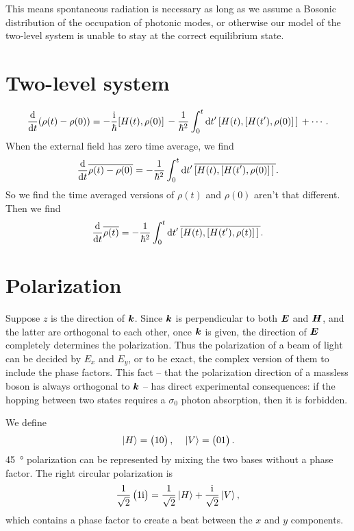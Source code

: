 \documentclass[hyperref, a4paper]{article}
\newcommand*{\ii}{\mathrm{i}}
\def\\{}%
\begin{document}
This means spontaneous radiation is necessary
as long as we assume a Bosonic distribution 
of the occupation of photonic modes, 
or otherwise our model of the two-level system is unable to 
stay at the correct equilibrium state. 

\section{Two-level system}

\begin{equation}
    \dv{t} (\rho(t) - \rho(0))
    = - \frac{\ii}{\hbar} \comm*{H(t)}{\rho(0)} 
    - \frac{1}{\hbar^2} \int_{0}^{t} \dd{t'} \comm*{H(t)}{\comm*{H(t')}{\rho(0)}} + \cdots.
\end{equation}
When the external field has zero time average, 
we find 
\[
    \dv{t} \overline{
        \rho(t) - \rho(0)
    } = - \frac{1}{\hbar^2} \int_{0}^{t} \dd{t'} 
    \overline{\comm*{H(t)}{\comm*{H(t')}{\rho(0)}}}.
\]
So we find the time averaged versions of $\rho(t)$ and $\rho(0)$ aren't that different.
Then we find 
\begin{equation}
    \dv{t} \overline{\rho(t)} = - \frac{1}{\hbar^2} \int_{0}^{t} \dd{t'} 
    \overline{\comm*{H(t)}{\comm*{H(t')}{\rho(t)}}}.
\end{equation}

\section{Polarization}

Suppose $z$ is the direction of $\vb*{k}$.
Since $\vb*{k}$ is perpendicular to both $\vb*{E}$ and $\vb*{H}$,
and the latter are orthogonal to each other, 
once $\vb*{k}$ is given, 
the direction of $\vb*{E}$ completely determines the polarization.
Thus the polarization of a beam of light can be decided by $E_x$ and $E_y$,
or to be exact, 
the complex version of them to include the phase factors.
This fact -- that the polarization direction of a massless boson is always orthogonal to $\vb*{k}$ -- 
has direct experimental consequences:
if the hopping between two states requires a $\sigma_0$ photon absorption, 
then it is forbidden.

We define 
\begin{equation}
    \ket*{H} = \pmqty{1 \\ 0}, \quad 
    \ket*{V} = \pmqty{0 \\ 1}.
\end{equation}
\SI{45}{\degree} polarization can be represented by 
mixing the two bases without a phase factor.
The right circular polarization is 
\begin{equation}
    \frac{1}{\sqrt{2}} \pmqty{1 \\ \ii} = 
    \frac{1}{\sqrt{2}} \ket*{H} 
    + \frac{\ii}{\sqrt{2}} \ket*{V} ,
\end{equation}
which contains a phase factor to create a beat 
between the $x$ and $y$ components. 
\end{document}
